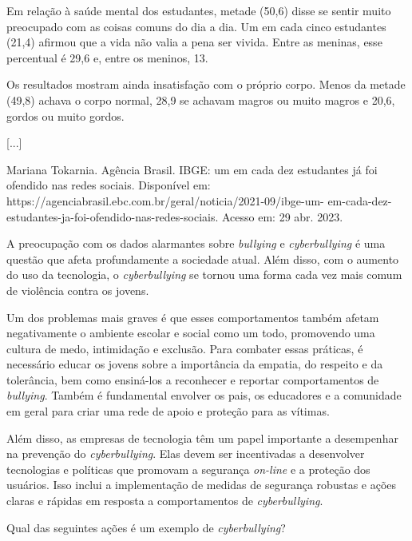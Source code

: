 Em relação à saúde mental dos estudantes, metade (50,6)
disse se sentir muito preocupado com as coisas comuns do dia a dia. Um
em cada cinco estudantes (21,4) afirmou que a vida não
valia a pena ser vivida. Entre as meninas, esse percentual é
29,6 e, entre os meninos, 13.

Os resultados mostram ainda insatisfação com o próprio corpo. Menos da
metade (49,8) achava o corpo normal,
28,9 se achavam magros ou muito magros e
20,6, gordos ou muito gordos.

{[}...{]}

Mariana Tokarnia. Agência Brasil. IBGE: um em
cada dez estudantes já foi ofendido nas redes sociais. Disponível em:
https://agenciabrasil.ebc.com.br/geral/noticia/2021-09/ibge-um-
em-cada-dez-estudantes-ja-foi-ofendido-nas-redes-sociais.
Acesso em: 29 abr. 2023.
\stopblockquote

A preocupação com os dados alarmantes sobre {\em bullying} e
{\em cyberbullying} é uma questão que afeta profundamente a sociedade
atual. Além disso, com o aumento do uso da tecnologia, o
{\em cyberbullying} se tornou uma forma cada vez mais comum de violência
contra os jovens.

Um dos problemas mais graves é que esses comportamentos também afetam
negativamente o ambiente escolar e social como um todo, promovendo uma
cultura de medo, intimidação e exclusão. Para combater essas práticas, é
necessário educar os jovens sobre a importância da empatia, do respeito
e da tolerância, bem como ensiná-los a reconhecer e reportar
comportamentos de {\em bullying}. Também é fundamental envolver os pais,
os educadores e a comunidade em geral para criar uma rede de apoio e
proteção para as vítimas.

Além disso, as empresas de tecnologia têm um papel importante a
desempenhar na prevenção do {\em cyberbullying}. Elas devem ser
incentivadas a desenvolver tecnologias e políticas que promovam a
segurança {\em on-line} e a proteção dos usuários. Isso inclui a
implementação de medidas de segurança robustas e ações claras e rápidas
em resposta a comportamentos de {\em cyberbullying}.

\placefigure{}{
\externalfigure[][width=1.4\textwidth]}

\subject[title={Atividades},reference={atividades}]

\startitemize[n][color=Red1,style=bf]
\item Qual das seguintes ações é um exemplo de {\em cyberbullying}?

